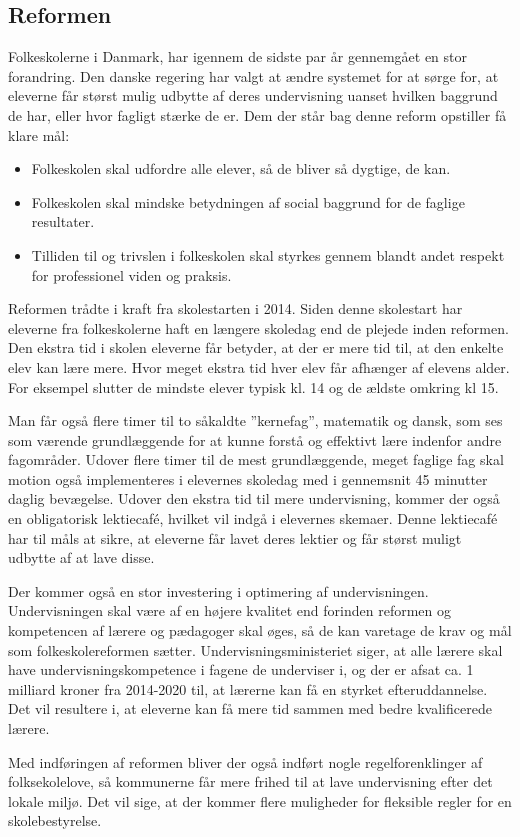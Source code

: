 \subsection{Reformen}
\label{Reformen}
Folkeskolerne i Danmark, har igennem de sidste par år gennemgået en stor forandring. Den danske regering har valgt at ændre systemet for at sørge for, at eleverne får størst mulig udbytte af deres undervisning uanset hvilken baggrund de har, eller hvor fagligt stærke de er.
Dem der står bag denne reform opstiller få klare mål:
	\begin{itemize}
		\item Folkeskolen skal udfordre alle elever, så de bliver så dygtige, de kan.
		\item Folkeskolen skal mindske betydningen af social baggrund for de faglige resultater.
		\item Tilliden til og trivslen i folkeskolen skal styrkes gennem blandt andet respekt for professionel viden og praksis.
	\end{itemize}

Reformen trådte i kraft fra skolestarten i 2014. Siden denne skolestart har eleverne fra folkeskolerne haft en længere skoledag end de plejede inden reformen. Den ekstra tid i skolen eleverne får betyder, at der er mere tid til, at den enkelte elev kan lære mere. Hvor meget ekstra tid hver elev får afhænger af elevens alder. For eksempel slutter de mindste elever typisk kl. 14 og de ældste omkring kl 15.

Man får også flere timer til to såkaldte ”kernefag”, matematik og dansk, som ses som værende grundlæggende for at kunne forstå og effektivt lære indenfor andre fagområder. Udover flere timer til de mest grundlæggende, meget faglige fag skal motion også implementeres i elevernes skoledag med i gennemsnit 45 minutter daglig bevægelse. Udover den ekstra tid til mere undervisning, kommer der også en obligatorisk lektiecafé, hvilket vil indgå i elevernes skemaer. Denne lektiecafé har til måls at sikre, at eleverne får lavet deres lektier og får størst muligt udbytte af at lave disse.

Der kommer også en stor investering i optimering af undervisningen. Undervisningen skal være af en højere kvalitet end forinden reformen og kompetencen af lærere og pædagoger skal øges, så de kan varetage de krav og mål som folkeskolereformen sætter. Undervisningsministeriet siger, at alle lærere skal have undervisningskompetence i fagene de underviser i, og der er afsat ca. 1 milliard kroner fra 2014-2020 til, at lærerne kan få en styrket efteruddannelse. Det vil resultere i, at eleverne kan få mere tid sammen med bedre kvalificerede lærere.

Med indføringen af reformen bliver der også indført nogle regelforenklinger af folksekolelove, så kommunerne får mere frihed til at lave undervisning efter det lokale miljø. Det vil sige, at der kommer flere muligheder for fleksible regler for en skolebestyrelse.
